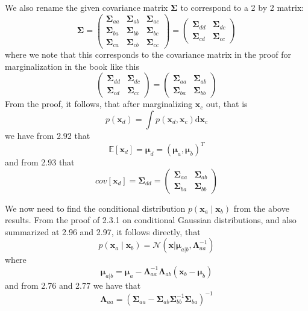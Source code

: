 \documentclass[a4paper, 11pt]{article}
\newcommand{\vect}[1]{\mathbf{#1}}
\begin{document}
We also rename the given covariance matrix $\boldsymbol \Sigma$ to correspond to a 2 by 2 matrix:
\[ \boldsymbol \Sigma   =   \begin{pmatrix} 
                    \boldsymbol \Sigma_{aa} & \boldsymbol \Sigma_{ab} & \boldsymbol \Sigma_{ac}\\
                    \boldsymbol \Sigma_{ba} & \boldsymbol \Sigma_{bb} & \boldsymbol \Sigma_{bc}\\
                    \boldsymbol \Sigma_{ca} & \boldsymbol \Sigma_{cb} & \boldsymbol \Sigma_{cc}
                \end{pmatrix}
            =   \begin{pmatrix} 
                    \boldsymbol \Sigma_{dd} & \boldsymbol \Sigma_{dc} \\
                    \boldsymbol \Sigma_{cd} & \boldsymbol \Sigma_{cc}
                \end{pmatrix}
\]
where we note that this corresponds to the covariance matrix in the proof for marginalization in the book like this
\[  \begin{pmatrix} 
        \boldsymbol \Sigma_{dd} & \boldsymbol \Sigma_{dc} \\
        \boldsymbol \Sigma_{cd} & \boldsymbol \Sigma_{cc}
    \end{pmatrix}
    =
    \begin{pmatrix} 
        \boldsymbol \Sigma_{aa} & \boldsymbol \Sigma_{ab} \\
        \boldsymbol \Sigma_{ba} & \boldsymbol \Sigma_{bb}
    \end{pmatrix}
\]
From the proof, it follows, that after marginalizing $\vect x_c$ out, that is
\[ p(\vect x_d) = \int p(\vect x_d, \vect x_c) \mathrm{d}\vect x_c \]
we have from 2.92 that
\[ \mathbb{E}[\vect x_d] = \boldsymbol \mu_d = (\boldsymbol \mu_a, \boldsymbol \mu_b)^T\]
and from 2.93 that
\[ cov[\vect x_d] = \boldsymbol \Sigma_{dd} =   
    \begin{pmatrix} 
        \boldsymbol \Sigma_{aa} & \boldsymbol \Sigma_{ab} \\
        \boldsymbol \Sigma_{ba} & \boldsymbol \Sigma_{bb}
    \end{pmatrix}
\]

We now need to find the conditional distribution $p(\vect x_a \; | \; \vect x_b)$ from the above results.
From the proof of 2.3.1 on conditional Gaussian distributions, and also summarized at 2.96 and 2.97, it follows directly, that
\[p(\vect x_a \; | \; \vect x_b) = \mathcal{N}(\vect x|\boldsymbol \mu_{a|b}, \boldsymbol \Lambda_{aa}^{-1})\]
where
\[ \boldsymbol \mu_{a|b} = \boldsymbol \mu_a - \boldsymbol \Lambda_{aa}^{-1}\boldsymbol \Lambda_{ab}(\vect x_b-\boldsymbol \mu_b) \]
and from 2.76 and 2.77 we have that
\[ \boldsymbol \Lambda_{aa} = (\boldsymbol \Sigma_{aa}-\boldsymbol \Sigma_{ab}\boldsymbol \Sigma_{bb}^{-1}\boldsymbol \Sigma_{ba})^{-1}\]
\end{document}

